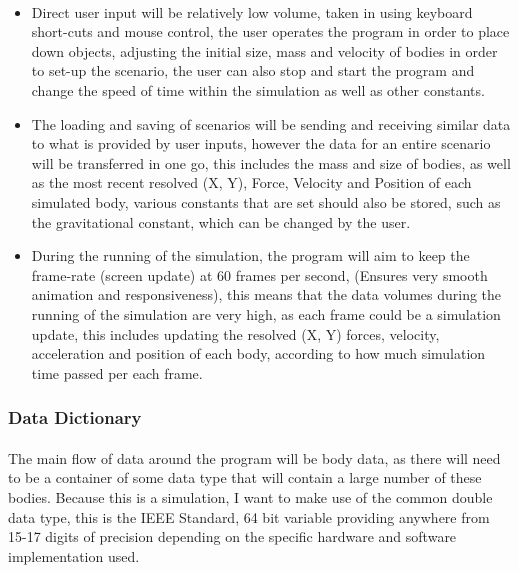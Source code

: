 \paragraph{}
\begin{itemize}
\item Direct user input will be relatively low volume, taken in using keyboard short-cuts and mouse control, the user operates the program in order to place down objects, adjusting the initial size, mass and velocity of bodies in order to set-up the scenario, the user can also stop and start the program and change the speed of time within the simulation as well as other constants.
\item The loading and saving of scenarios will be sending and receiving similar data to what is provided by user inputs, however the data for an entire scenario will be transferred in one go, this includes the mass and size of bodies, as well as the most recent resolved (X, Y), Force, Velocity and Position of each simulated body, various constants that are set should also be stored, such as the gravitational constant, which can be changed by the user.
\item During the running of the simulation, the program will aim to keep the frame-rate (screen update) at 60 frames per second, (Ensures very smooth animation and responsiveness), this means that the data volumes during the running of the simulation are very high, as each frame could be a simulation update, this includes updating the resolved (X, Y) forces, velocity, acceleration and position of each body, according to how much simulation time passed per each frame.
\end{itemize}

\pagebreak

\subsubsection{Data Dictionary}
\paragraph{}
The main flow of data around the program will be body data, as there will need to be a container of some data type that will contain a large number of these bodies. Because this is a simulation, I want to make use of the common double data type, this is the IEEE Standard, 64 bit variable providing anywhere from 15-17 digits of precision depending on the specific hardware and software implementation used.

